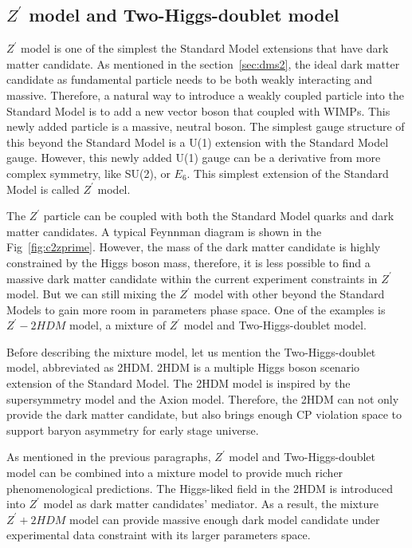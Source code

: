 \subsection{$Z^{\prime}$ model and Two-Higgs-doublet model}
\par $Z^{\prime}$ model\cite{He:1991qd} is one of the simplest the Standard Model extensions that have dark matter candidate. As mentioned in the section~\ref{sec:dms2}, the ideal dark matter candidate as fundamental particle needs to be both weakly interacting and massive. Therefore, a natural way to introduce a weakly coupled particle into the Standard Model is to add a new vector boson that coupled with WIMPs. This newly added particle is a massive, neutral boson. The simplest gauge structure of this beyond the Standard Model is a U(1) extension with the Standard Model gauge. However, this newly added U(1) gauge can be a derivative from more complex symmetry, like SU(2), or $E_{6}$. This simplest extension of the Standard Model is called $Z^{\prime}$ model.

\par The $Z^\prime$ particle can be coupled with both the Standard Model quarks and dark matter candidates. A typical Feynnman diagram is shown in the Fig~\ref{fig:c2zprime}. However, the mass of the dark matter candidate is highly constrained by the Higgs boson mass, therefore, it is less possible to find a massive dark matter candidate within the current experiment constraints in $Z^{\prime}$ model. But we can still mixing the $Z^{\prime}$ model with other beyond the Standard Models to gain more room in parameters phase space. One of the examples is $Z^{\prime}-2HDM$ model, a mixture of $Z^{\prime}$ model and Two-Higgs-doublet model.

\par Before describing the mixture model, let us mention the Two-Higgs-doublet model\cite{Branco:2011iw}, abbreviated as 2HDM. 2HDM is a multiple Higgs boson scenario extension of the Standard Model. The 2HDM model is inspired by the supersymmetry model\cite{Martin:1997ns} and the Axion model\cite{Peccei:2006as}. Therefore, the 2HDM can not only provide the dark matter candidate, but also brings enough CP violation space to support baryon asymmetry for early stage universe.


\par As mentioned in the previous paragraphs, $Z^{\prime}$ model and Two-Higgs-doublet model can be combined into a mixture model to provide much richer phenomenological predictions. The Higgs-liked field in the 2HDM is introduced into $Z^{\prime}$ model as dark matter candidates’ mediator. As a result, the mixture $Z^{\prime}+2HDM$ model\cite{Berlin:2014cfa} can provide massive enough dark model candidate under experimental data constraint with its larger parameters space.

